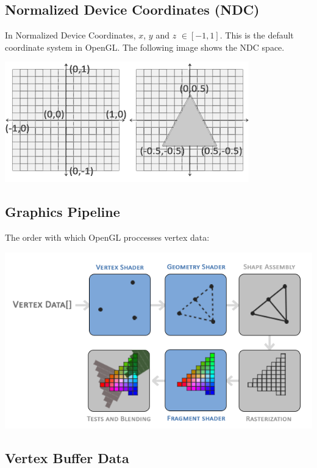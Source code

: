 \subsection{Normalized Device Coordinates (NDC)}

In Normalized Device Coordinates, $x$, $y$ and $z$ $\in [-1,1]$. This is the default coordinate system in OpenGL. The following image shows the NDC space.

\begin{center}
    \includegraphics[scale = 3]{pics/ndc.png}
\end{center}

\subsection{Graphics Pipeline}

The order with which OpenGL proccesses vertex data:

\begin{center}
    \includegraphics[scale = 2]{pics/pipeline.png}
\end{center}

\subsection{Vertex Buffer Data}

